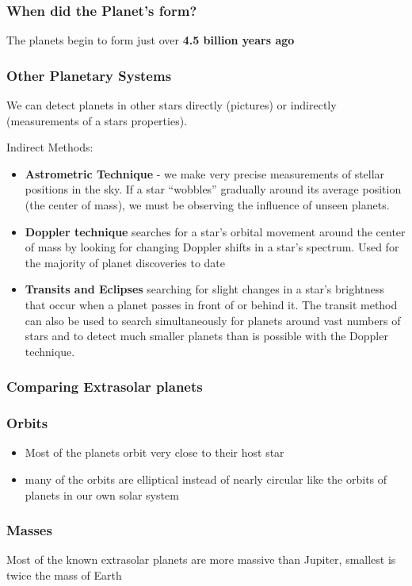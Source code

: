 \subsubsection{When did the Planet's form?}
The planets begin to form just over {\bf 4.5 billion years ago}

\subsubsection{Other Planetary Systems}
We can detect planets in other stars directly (pictures) or indirectly (measurements of a stars properties).

Indirect Methods:
\begin{itemize}
\item {\bf Astrometric Technique} - we make very precise measurements of stellar positions in the sky. If a star “wobbles” gradually around its average position (the center of mass), we must be observing the influence of unseen planets.
\item {\bf Doppler technique} searches for a star’s orbital movement around the center of mass by looking for changing Doppler shifts in a star’s spectrum. Used for the majority of planet discoveries to date
\item {\bf Transits and Eclipses} searching for slight changes in a star’s brightness that
occur when a planet passes in front of or behind it. The transit method can also be used to search simultaneously for planets around vast numbers of stars and to detect much smaller planets than is possible with the Doppler technique.
\end{itemize}

\subsubsection{Comparing Extrasolar planets}
\subsubsection*{Orbits}
\begin{itemize}
\item Most of the planets orbit very close to their host star
\item many of the orbits are elliptical instead of nearly circular like the orbits of planets in our own solar system
\end{itemize}

\subsubsection*{Masses}
Most of the known extrasolar planets are more massive than Jupiter, smallest is twice the mass of Earth
